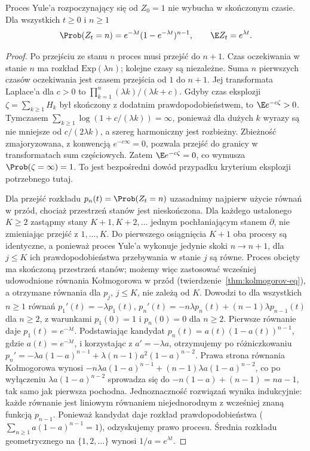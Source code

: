 \begin{twierdzenie}
Proces Yule'a rozpoczynający się od $Z_0=1$ nie wybucha
w skończonym czasie. Dla wszystkich $t\ge0$ i $n\ge1$
\[
\Prob(Z_t=n)=e^{-\lambda t}(1-e^{-\lambda t})^{n-1},
\qquad \E Z_t=e^{\lambda t}.
\]
\end{twierdzenie}
\begin{proof}
Po przejściu ze stanu $n$ proces musi przejść do $n+1$.
Czas oczekiwania w stanie $n$ ma rozkład
$\mathrm{Exp}(\lambda n)$; kolejne czasy są niezależne.
Suma $n$ pierwszych czasów oczekiwania jest czasem przejścia
od $1$ do $n+1$. Jej transformata Laplace'a dla $c>0$ to
$\prod_{k=1}^n (\lambda k)/(\lambda k+c)$.
Gdyby czas eksplozji $\zeta=\sum_{k\ge1}H_k$ był
skończony z dodatnim prawdopodobieństwem, to
$\E e^{-c\zeta}>0$. Tymczasem
$\sum_{k\ge1}\log(1+c/(\lambda k))=\infty$,
ponieważ dla dużych $k$ wyrazy są nie mniejsze od
$c/(2\lambda k)$, a szereg harmoniczny jest rozbieżny.
Zbieżność zmajoryzowana, z konwencją $e^{-c\infty}=0$,
pozwala przejść do granicy w transformatach sum
częściowych. Zatem $\E e^{-c\zeta}=0$, co wymusza
$\Prob(\zeta=\infty)=1$. To jest bezpośredni dowód
przypadku kryterium eksplozji potrzebnego tutaj.

Dla przejść rozkładu $p_n(t)=\Prob(Z_t=n)$
uzasadnimy najpierw użycie równań w przód, chociaż przestrzeń
stanów jest nieskończona. Dla każdego ustalonego $K\ge2$
zastąpmy stany $K+1,K+2,\ldots$ jednym pochłaniającym
stanem $\partial$, nie zmieniając przejść z $1,\ldots,K$.
Do pierwszego osiągnięcia $K+1$ oba procesy są identyczne,
a ponieważ proces Yule'a wykonuje jedynie skoki $n\to n+1$,
dla $j\le K$ ich prawdopodobieństwa przebywania w stanie $j$
są równe. Proces obcięty ma skończoną przestrzeń stanów;
możemy więc zastosować wcześniej udowodnione równania
Kołmogorowa w przód (twierdzenie~\ref{thm:kolmogorov-eq}),
a otrzymane równania dla $p_j$, $j\le K$,
nie zależą od $K$. Dowodzi to dla wszystkich $n\ge1$ równań
$p_1'(t)=-\lambda p_1(t)$,
$p_n'(t)=-n\lambda p_n(t)+(n-1)\lambda p_{n-1}(t)$ dla $n\ge2$,
z warunkami $p_1(0)=1$ i $p_n(0)=0$ dla $n\ge2$.
Pierwsze równanie daje $p_1(t)=e^{-\lambda t}$.
Podstawiając kandydat
$p_n(t)=a(t)(1-a(t))^{n-1}$, gdzie $a(t)=e^{-\lambda t}$,
i korzystając z $a'=-\lambda a$, otrzymujemy po różniczkowaniu
$p_n'=-\lambda a(1-a)^{n-1}+\lambda(n-1)a^2(1-a)^{n-2}$.
Prawa strona równania Kołmogorowa wynosi
$-n\lambda a(1-a)^{n-1}+(n-1)\lambda a(1-a)^{n-2}$,
co po wyłączeniu $\lambda a(1-a)^{n-2}$ sprowadza się do
$-n(1-a)+(n-1)=na-1$,
tak samo jak pierwsza pochodna.
Jednoznaczność rozwiązań wynika indukcyjnie: każde równanie
jest liniowym równaniem niejednorodnym z wcześniej znaną
funkcją $p_{n-1}$. Ponieważ kandydat daje rozkład
prawdopodobieństwa ($\sum_{n\ge1}a(1-a)^{n-1}=1$),
odzyskujemy prawo procesu. Średnia rozkładu
geometrycznego na $\{1,2,\ldots\}$ wynosi $1/a=e^{\lambda t}$.
\end{proof}

